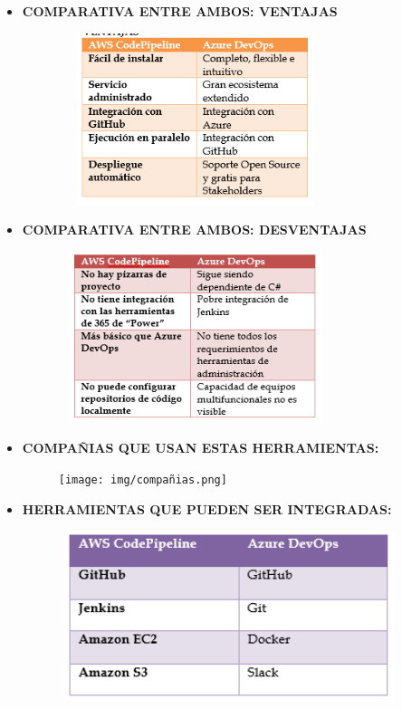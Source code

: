 \documentclass[12pt,a4paper,oneside]{book}
\begin{document}
\begin{enumerate}
\begin{itemize}
				\item \textbf{COMPARATIVA ENTRE AMBOS: VENTAJAS}
					\begin{center}
						\begin{figure}[htb]
							\centering \includegraphics[width=8cm, height=5cm]{img/comparativa1.png}
						\end{figure}
					\end{center}
		 \newpage
				\item \textbf{COMPARATIVA ENTRE AMBOS: DESVENTAJAS}
					\begin{center}
						\begin{figure}[htb]
							\centering \includegraphics[width=8cm, height=5cm]{img/comparativa2.png}
						\end{figure}
					\end{center}
					
				\item \textbf{COMPAÑIAS QUE USAN ESTAS HERRAMIENTAS:}
					\begin{center}
						\begin{figure}[htb]
							\centering \texttt{[image: img/compañias.png]}
						\end{figure}
					\end{center}
				\item \textbf{HERRAMIENTAS QUE PUEDEN SER INTEGRADAS:}
					\begin{center}
						\begin{figure}[htb]
							\centering \includegraphics[width=10cm, height=5cm]{img/herramientas.png}
						\end{figure}
					\end{center}
					

\end{itemize}
\end{enumerate}
\end{document}
